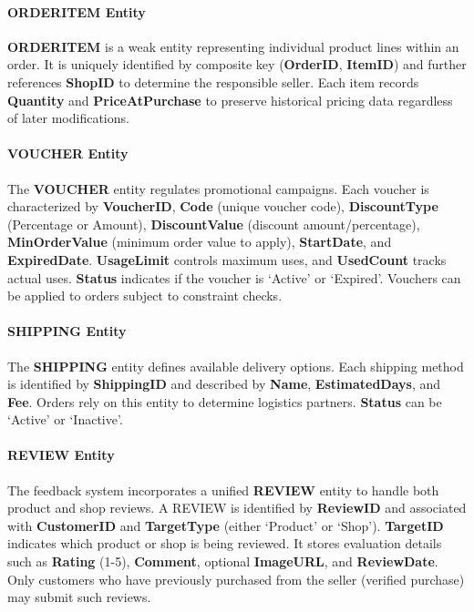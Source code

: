 \paragraph{ORDERITEM Entity}

\textbf{ORDERITEM} is a weak entity representing individual product lines within an order. It is uniquely identified by composite key (\textbf{OrderID}, \textbf{ItemID}) and further references \textbf{ShopID} to determine the responsible seller. Each item records \textbf{Quantity} and \textbf{PriceAtPurchase} to preserve historical pricing data regardless of later modifications.

\paragraph{VOUCHER Entity}

The \textbf{VOUCHER} entity regulates promotional campaigns. Each voucher is characterized by \textbf{VoucherID}, \textbf{Code} (unique voucher code), \textbf{DiscountType} (Percentage or Amount), \textbf{DiscountValue} (discount amount/percentage), \textbf{MinOrderValue} (minimum order value to apply), \textbf{StartDate}, and \textbf{ExpiredDate}. \textbf{UsageLimit} controls maximum uses, and \textbf{UsedCount} tracks actual uses. \textbf{Status} indicates if the voucher is `Active' or `Expired'. Vouchers can be applied to orders subject to constraint checks.

\paragraph{SHIPPING Entity}

The \textbf{SHIPPING} entity defines available delivery options. Each shipping method is identified by \textbf{ShippingID} and described by \textbf{Name}, \textbf{EstimatedDays}, and \textbf{Fee}. Orders rely on this entity to determine logistics partners. \textbf{Status} can be `Active' or `Inactive'.

\paragraph{REVIEW Entity}

The feedback system incorporates a unified \textbf{REVIEW} entity to handle both product and shop reviews. A REVIEW is identified by \textbf{ReviewID} and associated with \textbf{CustomerID} and \textbf{TargetType} (either `Product' or `Shop'). \textbf{TargetID} indicates which product or shop is being reviewed. It stores evaluation details such as \textbf{Rating} (1-5), \textbf{Comment}, optional \textbf{ImageURL}, and \textbf{ReviewDate}. Only customers who have previously purchased from the seller (verified purchase) may submit such reviews.

